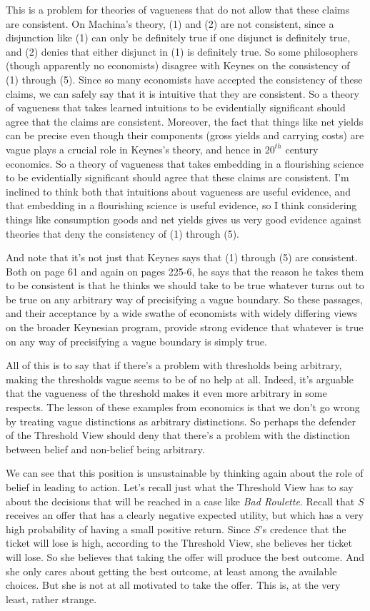 This is a problem for theories of vagueness that do not allow that these claims are consistent. On Machina's theory, (1) and (2) are not consistent, since a disjunction like (1) can only be definitely true if one disjunct is definitely true, and (2) denies that either disjunct in (1) is definitely true. So some philosophers (though apparently no economists) disagree with Keynes on the consistency of (1) through (5). Since so many economists have accepted the consistency of these claims, we can safely say that it is intuitive that they are consistent. So a theory of vagueness that takes learned intuitions to be evidentially significant should agree that the claims are consistent. Moreover, the fact that things like net yields can be precise even though their components (gross yields and carrying costs) are vague plays a crucial role in Keynes's theory, and hence in \(20^{th}\) century economics. So a theory of vagueness that takes embedding in a flourishing science to be evidentially significant should agree that these claims are consistent. I'm inclined to think both that intuitions about vagueness are useful evidence, and that embedding in a flourishing science is useful evidence, so I think considering things like consumption goods and net yields gives us very good evidence against theories that deny the consistency of (1) through (5).

And note that it's not just that Keynes says that (1) through (5) are consistent. Both on page 61 and again on pages 225-6, he says that the reason he takes them to be consistent is that he thinks we should take to be true whatever turns out to be true on any arbitrary way of precisifying a vague boundary. So these passages, and their acceptance by a wide swathe of economists with widely differing views on the broader Keynesian program, provide strong evidence that whatever is true on any way of precisifying a vague boundary is simply true.

All of this is to say that if there's a problem with thresholds being arbitrary, making the thresholds vague seems to be of no help at all. Indeed, it's arguable that the vagueness of the threshold makes it even more arbitrary in some respects. The lesson of these examples from economics is that we don't go wrong by treating vague distinctions as arbitrary distinctions. So perhaps the defender of the Threshold View should deny that there's a problem with the distinction between belief and non-belief being arbitrary.

We can see that this position is unsustainable by thinking again about the role of belief in leading to action. Let's recall just what the Threshold View has to say about the decisions that will be reached in a case like \textit{Bad Roulette}. Recall that \(S\) receives an offer that has a clearly negative expected utility, but which has a very high probability of having a small positive return. Since \(S\)'s credence that the ticket will lose is high, according to the Threshold View, she believes her ticket will lose. So she believes that taking the offer will produce the best outcome. And she only cares about getting the best outcome, at least among the available choices. But she is not at all motivated to take the offer. This is, at the very least, rather strange.

